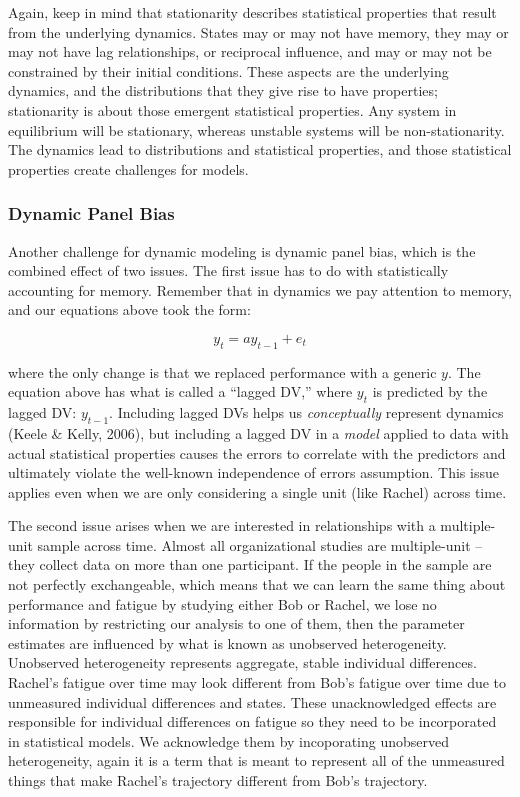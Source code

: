 \documentclass[english,,man]{apa6}
\theoremstyle{definition}
\theoremstyle{definition}
\theoremstyle{definition}
\theoremstyle{remark}
\begin{document}
Again, keep in mind that stationarity describes statistical properties
that result from the underlying dynamics. States may or may not have
memory, they may or may not have lag relationships, or reciprocal
influence, and may or may not be constrained by their initial
conditions. These aspects are the underlying dynamics, and the
distributions that they give rise to have properties; stationarity is
about those emergent statistical properties. Any system in equilibrium
will be stationary, whereas unstable systems will be non-stationarity.
The dynamics lead to distributions and statistical properties, and those
statistical properties create challenges for models.

\hypertarget{dynamic-panel-bias}{%
\subsubsection{Dynamic Panel Bias}\label{dynamic-panel-bias}}

Another challenge for dynamic modeling is dynamic panel bias, which is
the combined effect of two issues. The first issue has to do with
statistically accounting for memory. Remember that in dynamics we pay
attention to memory, and our equations above took the form:

\begin{equation}
y_{t} = a y_{t-1} + e_{t}
\end{equation}

\noindent where the only change is that we replaced performance with a
generic \(y\). The equation above has what is called a \enquote{lagged
DV,} where \(y_{t}\) is predicted by the lagged DV: \(y_{t-1}\).
Including lagged DVs helps us \emph{conceptually} represent dynamics
(Keele \& Kelly, 2006), but including a lagged DV in a \emph{model}
applied to data with actual statistical properties causes the errors to
correlate with the predictors and ultimately violate the well-known
independence of errors assumption. This issue applies even when we are
only considering a single unit (like Rachel) across time.

The second issue arises when we are interested in relationships with a
multiple-unit sample across time. Almost all organizational studies are
multiple-unit -- they collect data on more than one participant. If the
people in the sample are not perfectly exchangeable, which means that we
can learn the same thing about performance and fatigue by studying
either Bob or Rachel, we lose no information by restricting our analysis
to one of them, then the parameter estimates are influenced by what is
known as unobserved heterogeneity. Unobserved heterogeneity represents
aggregate, stable individual differences. Rachel's fatigue over time may
look different from Bob's fatigue over time due to unmeasured individual
differences and states. These unacknowledged effects are responsible for
individual differences on fatigue so they need to be incorporated in
statistical models. We acknowledge them by incoporating unobserved
heterogeneity, again it is a term that is meant to represent all of the
unmeasured things that make Rachel's trajectory different from Bob's
trajectory.
\end{document}
